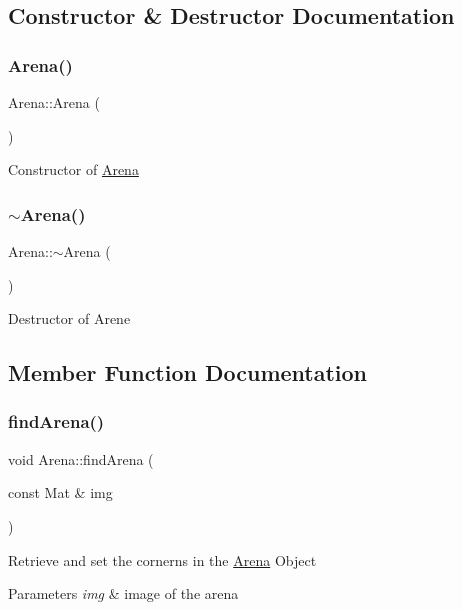 \subsection{Constructor \& Destructor Documentation}
\mbox{\label{class_arena_a74f105bc709d4728fb07f1984abfd345}} 
\subsubsection{\texorpdfstring{Arena()}{Arena()}}
{\footnotesize\ttfamily Arena\+::\+Arena (\begin{DoxyParamCaption}{ }\end{DoxyParamCaption})}

Constructor of \mbox{\hyperlink{class_arena}{Arena}} \mbox{\label{class_arena_ae21b399e9e3f6b8ac4ecc44d7d1667fc}} 
\subsubsection{\texorpdfstring{$\sim$\+Arena()}{~Arena()}}
{\footnotesize\ttfamily Arena\+::$\sim$\+Arena (\begin{DoxyParamCaption}{ }\end{DoxyParamCaption})}

Destructor of Arene 

\subsection{Member Function Documentation}
\mbox{\label{class_arena_aa37acdf43108ab0da04b77bbf79c2f7d}} 
\subsubsection{\texorpdfstring{find\+Arena()}{findArena()}}
{\footnotesize\ttfamily void Arena\+::find\+Arena (\begin{DoxyParamCaption}\item[{const Mat \&}]{img }\end{DoxyParamCaption})}

Retrieve and set the cornerns in the \mbox{\hyperlink{class_arena}{Arena}} Object 
\begin{DoxyParams}{Parameters}
{\em img} & image of the arena \\
\hline
\end{DoxyParams}
\mbox{\label{class_arena_afdd88e341c385561eafbc73e90e08404}} 
